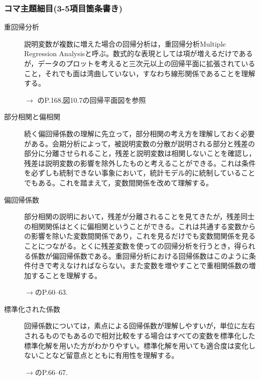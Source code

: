 \subsubsection{コマ主題細目(3-5項目箇条書き)}
\begin{description}


	\item[重回帰分析]説明変数が複数に増えた場合の回帰分析は，重回帰分析Multiple Regression Analysisと呼ぶ。数式的な表現としては項が増えるだけであるが，データのプロットを考えると三次元以上の回帰平面に拡張されていること，それでも面は湾曲していない，すなわち線形関係であることを理解する。
	      \begin{flushright}
		      $\to$ \citet{kosugi2019}のP.168,図10.7の回帰平面図を参照
	      \end{flushright}

	\item[部分相関と偏相関] 続く偏回帰係数の理解に先立って，部分相関の考え方を理解しておく必要がある。会期分析によって，被説明変数の分散が説明される部分と残差の部分に分離させられること，残差と説明変数は相関しないことを確認し，残差は説明変数の影響を除外したものと考えることができる。これは条件を必ずしも統制できない事象において，統計モデル的に統制していることでもある。これを踏まえて，変数間関係を改めて理解する。


	\item[偏回帰係数]部分相関の説明において，残差が分離されることを見てきたが，残差同士の相関関係はとくに偏相関ということができる。これは共通する変数からの影響を除いた変数間関係であり，これを見るだけでも変数間関係を見ることにつながる。とくに残差変数を使っての回帰分析を行うとき，得られる係数が偏回帰係数である。重回帰分析における回帰係数はこのように条件付きで考えなければならない。また変数を増やすことで重相関係数の増加することを理解する。
	      \begin{flushright}
		      $\to$\citet{kosugi2018}のP.60--63.
	      \end{flushright}

	\item[標準化された係数]回帰係数については，素点による回帰係数が理解しやすいが，単位に左右されるものでもあるので相対比較をする場合はすべての変数を標準化した標準化解を用いた方がわかりやすい。標準化解を用いても適合度は変化しないことなど留意点とともに有用性を理解する。
	      \begin{flushright}
		      $\to$\citet{kosugi2018}のP.66--67.
	      \end{flushright}




\end{description}
